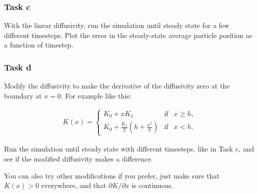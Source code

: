 \documentclass[a4paper]{article}
\begin{document}
\subsubsection*{Task c}

With the linear diffusivity, run the simulation until steady state for a few different timesteps. Plot the error in the steady-state average particle position as a function of timestep.


\subsubsection*{Task d}

Modify the diffusivity to make the derivative of the diffusivity zero at the boundary at $x=0$. For example like this:

\begin{align}
    \label{eq:K}
    K(x) = \left\{ \begin{array}{ccc} K_0 + x K_1 & \mathrm{if} &  x \geq h, \\
    K_0 + \frac{K_1}{2} \left(h + \frac{x^2}{h}\right) & \mathrm{if} & x < h. \end{array} \right.
\end{align}

Run the simulation until steady state with different timesteps, like in Task c, and see if the modified diffusivity makes a difference.

You can also try other modifications if you prefer, just make sure that $K(x) > 0$ everywhere, and that $\partial K/\partial x$ is continuous.
\end{document}
